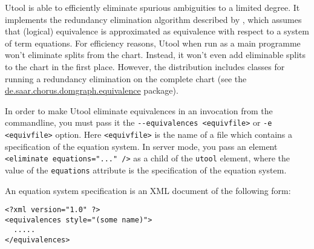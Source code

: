 Utool is able to efficiently eliminate spurious ambiguities to a
limited degree. It implements the redundancy elimination algorithm
described by , which assumes that (logical)
equivalence is approximated as equivalence with respect to a system of
term equations. For efficiency reasons, Utool when run as a main
programme won't eliminate splits from the chart. Instead, it won't
even add eliminable splits to the chart in the first place. However,
the distribution includes classes for running a redundancy elimination
on the complete chart (see the
\url{de.saar.chorus.domgraph.equivalence} package).

In order to make Utool eliminate equivalences in an invocation from
the commandline, you must pass it the
\verb?--equivalences <equivfile>? or \verb?-e <equivfile>?
option. Here \verb?<equivfile>? is the name of a file which contains a
specification of the equation system. In server mode, you pass an
element \verb?<eliminate equations="..." />? as a child of the
\verb?utool? element, where the value of the \verb?equations?
attribute is the specification of the equation system.

An equation system specification is an XML document of the following
form:

\begin{verbatim}
<?xml version="1.0" ?>
<equivalences style="(some name)">   
  .....
</equivalences>
\end{verbatim}

